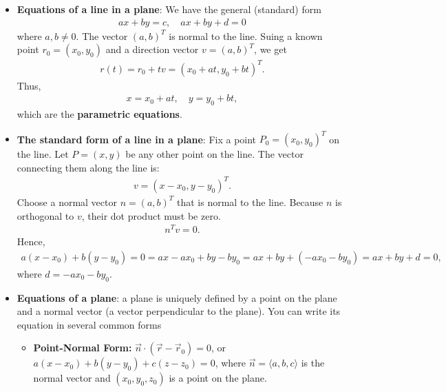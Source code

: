 \documentclass{report}
\begin{document}
\begin{itemize}
        \item \textbf{Equations of a line in a plane}: We have the general (standard) form
            \begin{align*}
               ax + by = c, \quad ax + by + d = 0 
            \end{align*}
            where $a,b \ne 0$. The vector $(a,b)^{T}$ is normal to the line.
            \bigbreak \noindent 
            Suing a known point $r_{0} = (x_{0}, y_{0}) $ and a direction vector $v = (a,b)^{T}$, we get
            \begin{align*}
                r(t) = r_{0} + tv = (x_{0} + at, y_{0} + bt)^{T}
            .\end{align*}
            Thus,
            \begin{align*}
                x = x_{0} + at, \quad y=  y_{0} + bt
            ,\end{align*}
            which are the \textbf{parametric equations}.
        \item \textbf{The standard form of a line in a plane}: Fix a point $P_{0} = (x_{0}, y_{0})^{T}$ on the line. Let \(P = (x, y)\) be any other point on the line. The vector connecting them along the line is:
            \begin{align*}
                v = (x-x_{0}, y-y_{0})^{T}
            .\end{align*}
            Choose a normal vector $n = (a,b)^{T}$ that is normal to the line. Because $n$ is orthogonal to $v$, their dot product must be zero.
            \begin{align*}
                n^{T}v = 0
            .\end{align*}
            Hence,
            \begin{align*}
                a(x-x_{0}) + b(y-y_{0}) = 0 = ax -ax_{0} + by -by_{0} = ax + by + (-ax_{0} - by_{0}) = ax + by + d = 0
            ,\end{align*}
            where $d = -ax_{0} - by_{0}$.
        \item \textbf{Equations of a plane}: a plane is uniquely defined by a point on the plane and a normal vector (a vector perpendicular to the plane). You can write its equation in several common forms
            \begin{itemize}
                \item \textbf{Point-Normal Form:} \(\vec{n} \cdot (\vec{r} - \vec{r}_0) = 0\), or \(a(x - x_0) + b(y - y_0) + c(z - z_0) = 0\), where \(\vec{n} = \langle a, b, c \rangle\) is the normal vector and \((x_0, y_0, z_0)\) is a point on the plane.

\end{itemize}
\end{itemize}
\end{document}
